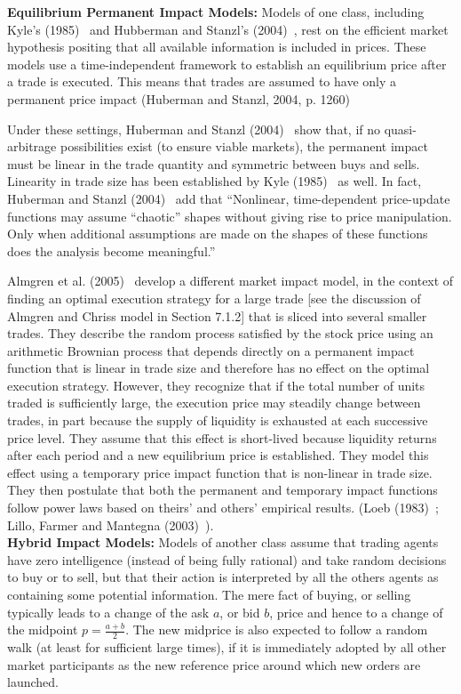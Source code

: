 \noindent \textbf{Equilibrium Permanent Impact Models:} Models of one class, including Kyle's (1985)~\cite{kyle1985} and Hubberman and Stanzl's (2004)~\cite{huberstan}, rest on the efficient market hypothesis positing that all available information is included in prices. These models use a time-independent framework to establish an equilibrium price after a trade is executed. This means that trades are assumed to have only a permanent price impact (Huberman and Stanzl, 2004, p. 1260)~\cite{huberstan}


Under these settings, Huberman and Stanzl (2004)~\cite{huberstan} show that, if no quasi-arbitrage possibilities exist (to ensure viable markets), the permanent impact must be linear in the trade quantity and symmetric between buys and sells. Linearity in trade size has been established by Kyle (1985)~\cite{kyle1985} as well. In fact, Huberman and Stanzl (2004)~\cite{huberstan} add that ``Nonlinear, time-dependent price-update functions may assume ``chaotic'' shapes without giving rise to price manipulation. Only when additional assumptions are made on the shapes of these functions does the analysis become meaningful.''


Almgren et al. (2005)~\cite{athl} develop a different market impact model, in the context of finding an optimal execution strategy for a large trade [see the discussion of Almgren and Chriss model in Section 7.1.2] that is sliced into several smaller trades. They describe the random process satisfied by the stock price using an arithmetic Brownian process that depends directly on a permanent impact function that is linear in trade size and therefore has no effect on the optimal execution strategy. However, they recognize that if the total number of units traded is sufficiently large, the execution price may steadily change between trades, in part because the supply of liquidity is exhausted at each successive price level. They assume that this effect is short-lived because liquidity returns after each period and a new equilibrium price is established. They model this effect using a temporary price impact function that is non-linear in trade size. They then postulate that both the permanent and temporary impact functions follow power laws based on theirs' and others' empirical results. (Loeb (1983)~\cite{loeb}; Lillo, Farmer and Mantegna (2003)~\cite{farmermantegna}). \\


\noindent \textbf{Hybrid Impact Models:} Models of another class assume that trading agents have zero intelligence (instead of being fully rational) and take random decisions to buy or to sell, but that their action is interpreted by all the others agents as containing some potential information. The mere fact of buying, or selling typically leads to a change of the ask $a$, or bid $b$, price and hence to a change of the midpoint $p=\frac{a+b}{2}$. The new midprice is also expected to follow a random walk (at least for sufficient large times), if it is immediately adopted by all other market participants as the new reference price around which new orders are launched.


